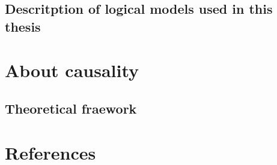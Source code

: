 \documentclass[a4paper,12pt,twoside,onecolumn,openright,final,oldfontcommands]{memoir}
\begin{document}
\section{Descritption of logical models used in this
thesis}\label{descritption-of-logical-models-used-in-this-thesis}

\chapter{About causality}\label{about-causality}

\section{Theoretical fraework}\label{theoretical-fraework}

\chapter*{References}\label{references}


\setlength{\parindent}{-0.5in} \setlength{\leftskip}{0.5in}
\setlength{\parskip}{8pt}


\end{document}
